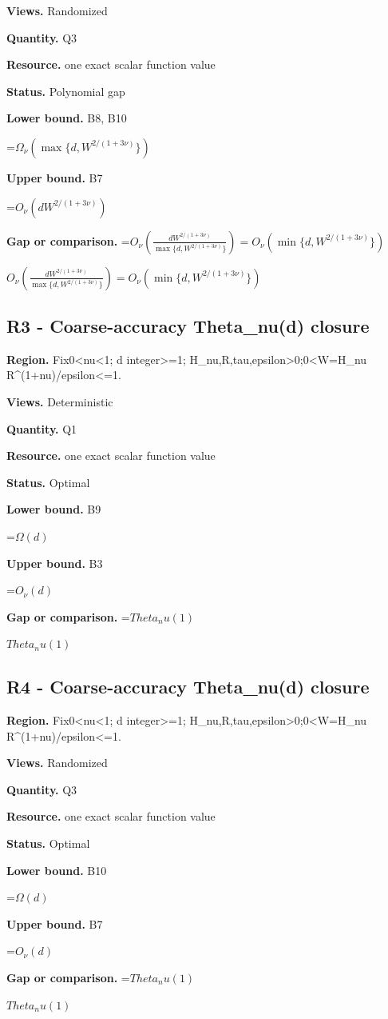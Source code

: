 \documentclass[10pt,a4paper]{article}
\newcommand{\AtlasMath}[1]{\par\begingroup\centering\setbox0=\hbox{$\displaystyle #1$}\ifdim\wd0>1.4\linewidth\typeout{ATLAS WIDE FORMULA: \the\wd0}\fi\ifdim\wd0>\linewidth\resizebox{\linewidth}{!}{\box0}\else\box0\fi\par\endgroup}
\newcommand{\AtlasInlineMath}[1]{\begingroup\setbox0=\hbox{$#1$}\ifdim\wd0>.4\linewidth\endgroup\AtlasMath{#1}\else\endgroup$#1$\fi}
\begin{document}
\textbf{Views.} Randomized

\textbf{Quantity.} Q3

\textbf{Resource.} one exact scalar function value

\textbf{Status.} Polynomial gap

\textbf{Lower bound.} B8, B10

\AtlasMath{\Omega_\nu(\max\{d,W^{2/(1+3\nu)}\})}
\textbf{Upper bound.} B7

\AtlasMath{O_\nu(d W^{2/(1+3\nu)})}
\textbf{Gap or comparison.} \AtlasInlineMath{O_\nu\!\left(\frac{dW^{2/(1+3\nu)}}{\max\{d,W^{2/(1+3\nu)}\}}\right)=O_\nu(\min\{d,W^{2/(1+3\nu)}\})}

\subsection{R3 - Coarse-accuracy Theta\_\allowbreak{}nu(d) closure}
\textbf{Region.} Fix0<nu<1; d integer>=1; H\_\allowbreak{}nu,R,tau,epsilon>0;0<W=H\_\allowbreak{}nu R\textasciicircum{}(1+nu)/epsilon<=1.

\textbf{Views.} Deterministic

\textbf{Quantity.} Q1

\textbf{Resource.} one exact scalar function value

\textbf{Status.} Optimal

\textbf{Lower bound.} B9

\AtlasMath{\Omega(d)}
\textbf{Upper bound.} B3

\AtlasMath{O_\nu(d)}
\textbf{Gap or comparison.} \AtlasInlineMath{Theta_nu(1)}

\subsection{R4 - Coarse-accuracy Theta\_\allowbreak{}nu(d) closure}
\textbf{Region.} Fix0<nu<1; d integer>=1; H\_\allowbreak{}nu,R,tau,epsilon>0;0<W=H\_\allowbreak{}nu R\textasciicircum{}(1+nu)/epsilon<=1.

\textbf{Views.} Randomized

\textbf{Quantity.} Q3

\textbf{Resource.} one exact scalar function value

\textbf{Status.} Optimal

\textbf{Lower bound.} B10

\AtlasMath{\Omega(d)}
\textbf{Upper bound.} B7

\AtlasMath{O_\nu(d)}
\textbf{Gap or comparison.} \AtlasInlineMath{Theta_nu(1)}
\end{document}

